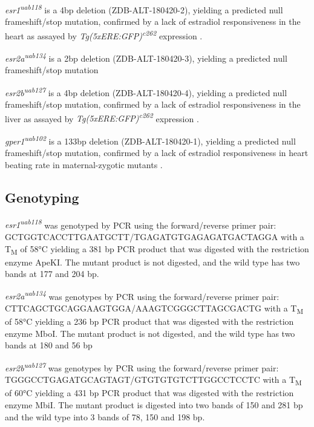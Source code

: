 \documentclass[9pt,lineno]{RandlettLab_elife}
\begin{document}
\emph{esr1\textsuperscript{uab118}} is a 4bp deletion (ZDB-ALT-180420-2), yielding a predicted null frameshift/stop mutation, confirmed by a lack of estradiol responsiveness in the heart as assayed by \emph{Tg(5xERE:GFP)\textsuperscript{c262}} expression \citep{Romano2017-ep}. 

\emph{esr2a\textsuperscript{uab134}} is a 2bp deletion (ZDB-ALT-180420-3), yielding a predicted null frameshift/stop mutation \citep{Romano2017-ep}

\emph{esr2b\textsuperscript{uab127}} is a 4bp deletion (ZDB-ALT-180420-4), yielding a predicted null frameshift/stop mutation, confirmed by a lack of estradiol responsiveness in the liver as assayed by \emph{Tg(5xERE:GFP)\textsuperscript{c262}} expression \citep{Romano2017-ep}. 

\emph{gper1\textsuperscript{uab102}} is a 133bp deletion (ZDB-ALT-180420-1), yielding a predicted null frameshift/stop mutation, confirmed by a lack of estradiol responsiveness in heart beating rate in maternal-zygotic mutants \citep{Romano2017-ep}.

\subsection{Genotyping}

\emph{esr1\textsuperscript{uab118}} was genotyped by PCR using the forward/reverse primer pair:
\\ \mbox{GCTGGTCACCTTGAATGCTT/TGAGATGTGAGAGATGACTAGGA} with a T\textsubscript{M} of 58°C yielding a 381 bp PCR product that was digested with the restriction enzyme ApeKI. 
The mutant product is not digested, and the wild type has two bands at 177 and 204 bp.

\emph{esr2a\textsuperscript{uab134}} was genotypes by PCR using the forward/reverse primer pair:
\\ \mbox{CTTCAGCTGCAGGAAGTGGA/AAAGTCGGGCTTAGCGACTG} with a T\textsubscript{M} of 58°C yielding a 236 bp PCR product that was digested with the restriction enzyme MboI.
The mutant product is not digested, and the wild type has two bands at 180 and 56 bp 

\emph{esr2b\textsuperscript{uab127}} was genotypes by PCR using the forward/reverse primer pair:
\\ \mbox{TGGGCCTGAGATGCAGTAGT/GTGTGTGTCTTGGCCTCCTC} with a T\textsubscript{M} of 60°C yielding a 431 bp PCR product that was digested with the restriction enzyme MbiI.
The mutant product is digested into two bands of 150 and 281 bp and the wild type into 3 bands of 78, 150 and 198 bp. 
\end{document}
